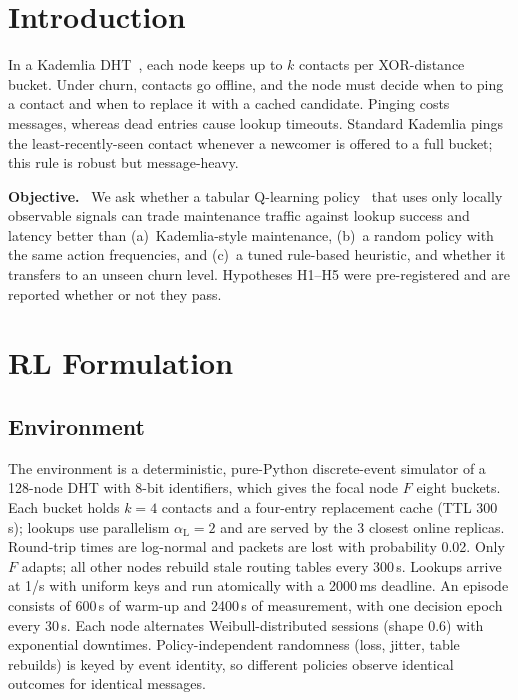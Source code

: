 \documentclass[9pt,twocolumn]{extarticle}
\newcommand{\inl}[1]{\mbox{\textbf{#1.}}\ }
\begin{document}

\section{Introduction}
In a Kademlia DHT~\cite{kad}, each node keeps up to $k$ contacts per XOR-distance bucket. Under churn, contacts go offline, and the node must decide when to ping a contact and when to replace it with a cached candidate. Pinging costs messages, whereas dead entries cause lookup timeouts. Standard Kademlia pings the least-recently-seen contact whenever a newcomer is offered to a full bucket; this rule is robust but message-heavy.

\inl{Objective} We ask whether a tabular Q-learning policy~\cite{wat,sb} that uses only locally observable signals can trade maintenance traffic against lookup success and latency better than (a)~Kademlia-style maintenance, (b)~a random policy with the same action frequencies, and (c)~a tuned rule-based heuristic, and whether it transfers to an unseen churn level. Hypotheses H1--H5 were pre-registered and are reported whether or not they pass.

\section{RL Formulation}
\subsection{Environment}
The environment is a deterministic, pure-Python discrete-event simulator of a 128-node DHT with 8-bit identifiers, which gives the focal node $F$ eight buckets. Each bucket holds $k=4$ contacts and a four-entry replacement cache (TTL 300\,s); lookups use parallelism $\alpha_{\mathrm{L}}=2$ and are served by the 3 closest online replicas. Round-trip times are log-normal and packets are lost with probability 0.02. Only $F$ adapts; all other nodes rebuild stale routing tables every 300\,s. Lookups arrive at 1/s with uniform keys and run atomically with a 2000\,ms deadline. An episode consists of 600\,s of warm-up and 2400\,s of measurement, with one decision epoch every 30\,s. Each node alternates Weibull-distributed sessions (shape 0.6) with exponential downtimes. Policy-independent randomness (loss, jitter, table rebuilds) is keyed by event identity, so different policies observe identical outcomes for identical messages.
\end{document}
